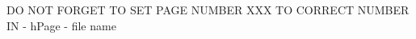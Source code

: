 \documentclass[11pt]{amsbook}
\begin{document}

DO NOT FORGET TO SET PAGE NUMBER XXX TO CORRECT NUMBER IN 
- hPage 
- file name
\end{document}
